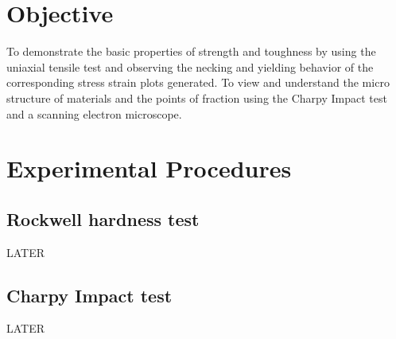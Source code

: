 \documentclass{article}
\begin{document}



\section{Objective}

To demonstrate the basic properties of strength and toughness by using the uniaxial tensile test and observing the necking and yielding behavior of the corresponding stress strain plots generated. To view and understand the micro structure of materials and the points of fraction using the Charpy Impact test and a scanning electron microscope. 


\section{Experimental Procedures}
\subsection{Rockwell hardness test}
LATER

\subsection{Charpy Impact test}
LATER

\end{document}
